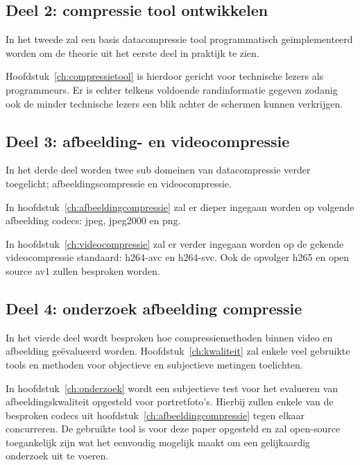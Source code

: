 \subsection{Deel 2: compressie tool ontwikkelen}
\label{sec:opzet-bachelorproef-deel-2}
 
 In het tweede zal een basis \gls{datacompressie} tool programmatisch geïmplementeerd worden om de theorie uit het eerste deel in praktijk te zien.
 
Hoofdstuk~\ref{ch:compressietool} is hierdoor gericht voor technische lezers als programmeurs. Er is echter telkens voldoende randinformatie gegeven zodanig ook de minder technische lezers een blik achter de schermen kunnen verkrijgen.

\subsection{Deel 3: afbeelding- en videocompressie}
\label{sec:opzet-bachelorproef-deel-3}

In het derde deel worden twee sub domeinen van \gls{datacompressie} verder toegelicht; \gls{afbeeldingscompressie} en \gls{videocompressie}. 

In hoofdstuk~\ref{ch:afbeeldingcompressie} zal er dieper ingegaan worden op volgende afbeelding \glspl{codec}: \gls{jpeg}, \gls{jpeg2000} en \gls{png}. 

In hoofdstuk~\ref{ch:videocompressie} zal er verder ingegaan worden op de gekende \gls{videocompressie} standaard: \gls{h264-avc} en \gls{h264-svc}. Ook de opvolger \gls{h265} en open source \gls{av1} zullen besproken worden.

\subsection{Deel 4: onderzoek afbeelding compressie}
\label{sec:opzet-bachelorproef-deel-4}

In het vierde deel wordt besproken hoe compressiemethoden binnen video en afbeelding geëvalueerd worden. Hoofdstuk~\ref{ch:kwaliteit} zal enkele veel gebruikte tools en methoden voor objectieve en subjectieve metingen toelichten.

In hoofdstuk~\ref{ch:onderzoek} wordt een subjectieve test voor het evalueren van afbeeldingskwaliteit opgesteld voor portretfoto's. Hierbij zullen enkele van de besproken  \glspl{codec} uit hoofdstuk~\ref{ch:afbeeldingcompressie} tegen elkaar concurreren. De gebruikte tool is voor deze paper opgesteld en zal \gls{open-source} toegankelijk zijn wat het eenvoudig mogelijk maakt om een gelijkaardig onderzoek uit te voeren.

